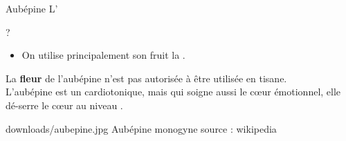 \ficheidentiteplante
{Aubépine}
{%
    L' 
}
{%
    
}
{%
    ?
}
{%
    \begin{itemize}[label = \bcplume]
        \item On utilise principalement son fruit la .
    \end{itemize}
}
{%
    \begin{Remarque}
        La \textbf{fleur} de l'aubépine n'est pas autorisée à être utilisée en tisane.\\

        L'aubépine est un cardiotonique, mais qui soigne aussi le cœur émotionnel, elle dé-serre le cœur au niveau .
    \end{Remarque}
}
{%
    downloads/aubepine.jpg
}
{%
    Aubépine monogyne
}
{%
    source : wikipedia
}